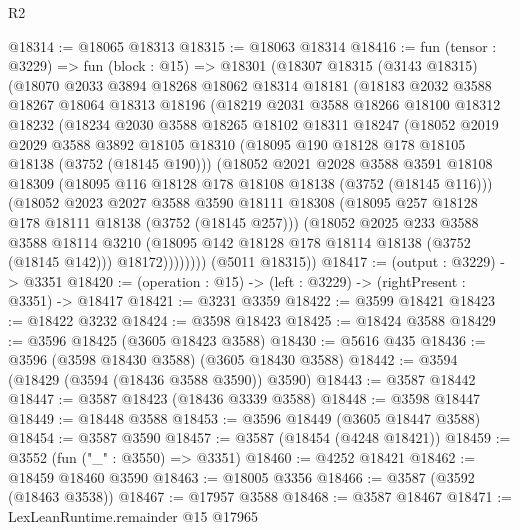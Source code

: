 \begin{lexlean}{R2}
\begin{coremodule}
@18314 := @18065 @18313
@18315 := @18063 @18314
@18416 := fun (tensor : @3229) =>
  fun (block : @15) =>
  @18301
    (@18307
      @18315
      (@3143 @18315)
      (@18070
        @2033
        @3894
        @18268
        @18062
        @18314
        @18181
        (@18183
          @2032
          @3588
          @18267
          @18064
          @18313
          @18196
          (@18219
            @2031
            @3588
            @18266
            @18100
            @18312
            @18232
            (@18234
              @2030
              @3588
              @18265
              @18102
              @18311
              @18247
              (@18052
                @2019
                @2029
                @3588
                @3892
                @18105
                @18310
                (@18095 @190 @18128 @178 @18105 @18138 (@3752 (@18145 @190)))
                (@18052
                  @2021
                  @2028
                  @3588
                  @3591
                  @18108
                  @18309
                  (@18095 @116 @18128 @178 @18108 @18138 (@3752 (@18145 @116)))
                  (@18052
                    @2023
                    @2027
                    @3588
                    @3590
                    @18111
                    @18308
                    (@18095 @257 @18128 @178 @18111 @18138 (@3752 (@18145 @257)))
                    (@18052
                      @2025
                      @233
                      @3588
                      @3588
                      @18114
                      @3210
                      (@18095 @142 @18128 @178 @18114 @18138 (@3752 (@18145 @142)))
                      @18172))))))))
      (@5011 @18315))
@18417 := (output : @3229) -> @3351
@18420 := (operation : @15) -> (left : @3229) -> (rightPresent : @3351) -> @18417
@18421 := @3231 @3359
@18422 := @3599 @18421
@18423 := @18422 @3232
@18424 := @3598 @18423
@18425 := @18424 @3588
@18429 := @3596 @18425 (@3605 @18423 @3588)
@18430 := @5616 @435
@18436 := @3596 (@3598 @18430 @3588) (@3605 @18430 @3588)
@18442 := @3594 (@18429 (@3594 (@18436 @3588 @3590)) @3590)
@18443 := @3587 @18442
@18447 := @3587 @18423 (@18436 @3339 @3588)
@18448 := @3598 @18447
@18449 := @18448 @3588
@18453 := @3596 @18449 (@3605 @18447 @3588)
@18454 := @3587 @3590
@18457 := @3587 (@18454 (@4248 @18421))
@18459 := @3552 (fun ("_" : @3550) => @3351)
@18460 := @4252 @18421
@18462 := @18459 @18460 @3590
@18463 := @18005 @3356
@18466 := @3587 (@3592 (@18463 @3538))
@18467 := @17957 @3588
@18468 := @3587 @18467
@18471 := LexLeanRuntime.remainder @15 @17965

\end{coremodule}
\end{lexlean}
